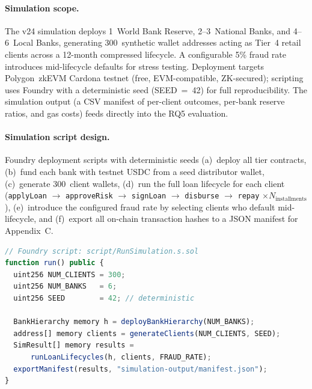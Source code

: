 \documentclass[12pt,a4paper]{report}
\begin{document}
\paragraph{Simulation scope.}
The v24 simulation deploys 1~World Bank Reserve, 2--3~National Banks, and 4--6~Local Banks, generating 300~synthetic wallet addresses acting as Tier~4 retail clients across a 12-month compressed lifecycle. A configurable 5\% fraud rate introduces mid-lifecycle defaults for stress testing. Deployment targets Polygon~zkEVM Cardona testnet (free, EVM-compatible, ZK-secured); scripting uses Foundry with a deterministic seed (SEED~=~42) for full reproducibility. The simulation output (a CSV manifest of per-client outcomes, per-bank reserve ratios, and gas costs) feeds directly into the RQ5 evaluation.

\paragraph{Simulation script design.}
Foundry deployment scripts with deterministic seeds (a)~deploy all tier contracts, (b)~fund each bank with testnet USDC from a seed distributor wallet, (c)~generate 300~client wallets, (d)~run the full loan lifecycle for each client (\texttt{applyLoan} $\to$ \texttt{approveRisk} $\to$ \texttt{signLoan} $\to$ \texttt{disburse} $\to$ \texttt{repay} $\times N_\text{installments}$), (e)~introduce the configured fraud rate by selecting clients who default mid-lifecycle, and (f)~export all on-chain transaction hashes to a JSON manifest for Appendix~C.

\begin{lstlisting}[language=JavaScript, caption={Foundry simulation entry-point (structure)}]
// Foundry script: script/RunSimulation.s.sol
function run() public {
  uint256 NUM_CLIENTS = 300;
  uint256 NUM_BANKS   = 6;
  uint256 SEED        = 42; // deterministic

  BankHierarchy memory h = deployBankHierarchy(NUM_BANKS);
  address[] memory clients = generateClients(NUM_CLIENTS, SEED);
  SimResult[] memory results =
      runLoanLifecycles(h, clients, FRAUD_RATE);
  exportManifest(results, "simulation-output/manifest.json");
}
\end{lstlisting}
\end{document}
